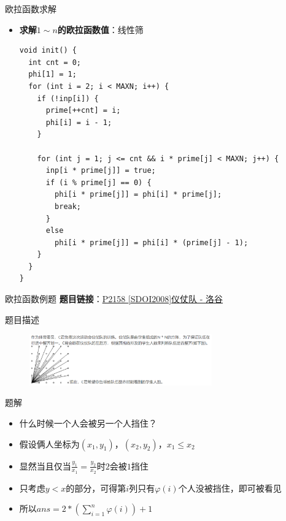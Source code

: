 \begin{frame}[fragile]{欧拉函数}{求解}
  \begin{itemize}
    \item \textbf{求解$1\sim n$的欧拉函数值}：线性筛
    \begin{lstlisting}
void init() {
  int cnt = 0;
  phi[1] = 1;
  for (int i = 2; i < MAXN; i++) {
    if (!inp[i]) {
      prime[++cnt] = i;
      phi[i] = i - 1;
    }

    for (int j = 1; j <= cnt && i * prime[j] < MAXN; j++) {
      inp[i * prime[j]] = true;
      if (i % prime[j] == 0) {
        phi[i * prime[j]] = phi[i] * prime[j];
        break;
      }
      else 
        phi[i * prime[j]] = phi[i] * (prime[j] - 1);      
    }
  }
}
    \end{lstlisting}
  \end{itemize}
\end{frame}

\begin{frame}[fragile]{欧拉函数}{例题}
  \textbf{题目链接}：\href{https://www.luogu.com.cn/problem/P2158}{P2158 [SDOI2008]仪仗队 - 洛谷}
  \begin{block}{题目描述}
    \begin{figure}
      \includegraphics[width=0.7\textwidth]{images/img1.png}
    \end{figure}
  \end{block}

  \pause 
  \begin{exampleblock}{题解}
    \begin{itemize}
      \item 什么时候一个人会被另一个人挡住？
      \pause 
      \item 假设俩人坐标为$(x_1,y_1)$，$(x_2,y_2)$，$x_1\leq x_2$
      \item 显然当且仅当$\frac{y_1}{x_1}=\frac{y_2}{x_2}$时$2$会被$1$挡住
      \pause
      \item 只考虑$y<x$的部分，可得第$i$列只有$\varphi(i)$个人没被挡住，即可被看见
      \pause 
      \item 所以$ans =2*(\sum\limits_{i=1}^n\varphi(i))+1$
    \end{itemize}
  \end{exampleblock}
\end{frame}

